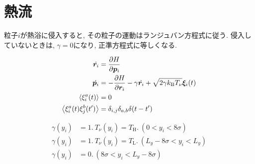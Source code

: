 \section{熱流}











粒子$i$が熱浴に侵入すると, その粒子の運動はランジュバン方程式に従う. 侵入していないときは, $\gamma = 0$になり, 正準方程式に等しくなる.

\begin{align}
  \dot{\bm{r}_i} &= \pdv{H}{\bm{p}_i} \\
  \dot{\bm{p}_i} &= - \pdv{H}{\bm{r}_i} - \gamma \dot{\bm{r}_i} + \sqrt{2 \gamma k_{\text{B}}T_{\nu}}\bm{\xi}_i (t) \\
  \expval{\xi_{i}^{a}(t)} &= 0 \\
  \expval{\xi_{i}^{a}(t)\xi_{j}^{b}(t')} &= \delta_{i,j} \delta_{a,b}\delta (t-t')
\end{align}

\begin{align}
  \gamma(y_i) &= 1. \ T_{\nu}(y_i) = T_{\text{H}}. \ (0 < y_i < 8\sigma) \\
  \gamma(y_i) &= 1. \ T_{\nu}(y_i) = T_{\text{L}}. \ (L_y - 8\sigma < y_i < L_y) \\
  \gamma(y_i) &= 0.  \ (8\sigma < y_i < L_y - 8\sigma)
\end{align}
